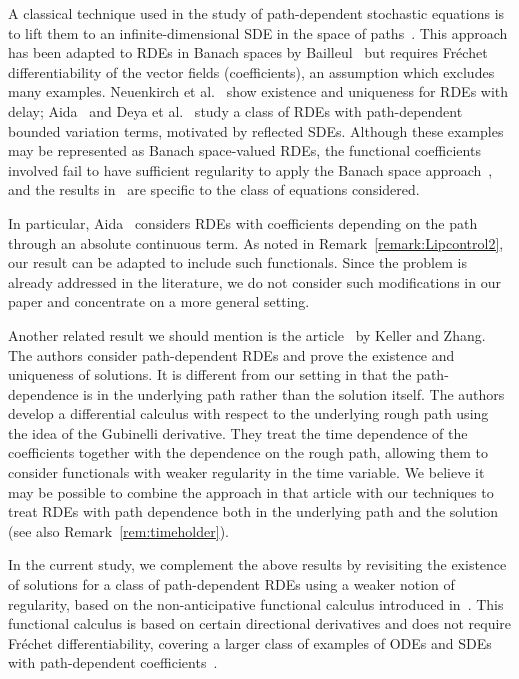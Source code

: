 \documentclass[AHL,Unicode,longabstracts,published]{cedram}
\begin{document}
A classical technique used in the study of path-dependent stochastic equations is to lift them to an infinite-dimensional SDE in the space of paths~\cite{Moh}. This approach has been adapted to RDEs in Banach spaces by Bailleul~\cite{bailleul2014} but requires Fréchet differentiability of the vector fields (coefficients), an assumption which excludes many examples. Neuenkirch et al.~\cite{neuenkirch2008} show existence and uniqueness for RDEs with delay; Aida~\cite{aida2019} and Deya et al.~\cite{deya2019} study a class of RDEs with path-dependent bounded variation terms, motivated by reflected SDEs. Although these examples may be represented as Banach space-valued RDEs, the functional coefficients involved fail to have sufficient regularity to apply the Banach space approach~\cite{bailleul2014}, and the results in~\cite{deya2019,neuenkirch2008,aida2019} are specific to the class of equations considered.

In particular, Aida~\cite{aida2019} considers RDEs with coefficients depending on the path through an absolute continuous term. As noted in Remark~\ref{remark:Lipcontrol2}, our result can be adapted to include such functionals. Since the problem is already addressed in the literature, we do not consider such modifications in our paper and concentrate on a more general setting.

Another related result we should mention is the article~\cite{KellerZhang} by Keller and Zhang. The authors consider path-dependent RDEs and prove the existence and uniqueness of solutions. It is different from our setting in that the path-dependence is in the underlying path rather than the solution itself. The authors develop a differential calculus with respect to the underlying rough path using the idea of the Gubinelli derivative. They treat the time dependence of the coefficients together with the dependence on the rough path, allowing them to consider functionals with weaker regularity in the time variable. We believe it may be possible to combine the approach in that article with our techniques to treat RDEs with path dependence both in the underlying path and the solution (see also Remark~\ref{rem:timeholder}).

In the current study, we complement the above results by revisiting the existence of solutions for a class of path-dependent RDEs using a weaker notion of regularity, based on the non-anticipative functional calculus introduced in~\cite{CF09, cont2012, D09}. This functional calculus is based on certain directional derivatives and does not require Fréchet differentiability, covering a larger class of examples of ODEs and SDEs with path-dependent coefficients~\cite{ContKalinin}.
\end{document}
